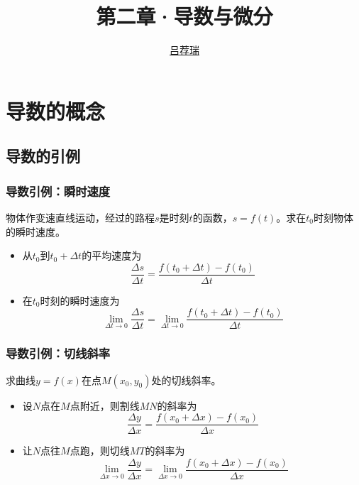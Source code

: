 \documentclass[14pt,notheorems,leqno,xcolor={rgb}]{beamer} %
\begin{document}
\title{第二章·导数与微分}
\author{\href{https://lvjr.bitbucket.io}{吕荐瑞}}

\begin{frame}[plain]
\titlepage
\end{frame}

\section{导数的概念}

\subsection{导数的引例}

\begin{frame}
\frametitle{导数引例：瞬时速度}
\begin{example}
物体作变速直线运动，经过的路程$s$是时刻$t$的函数，$s=f(t)$。求在$t_0$时刻物体的瞬时速度。
\end{example}\pause
\begin{itemize}[<+->]
  \item 从$t_0$到$t_0+\Delta t$的平均速度为
  $$\dfrac{\Delta s}{\Delta t}=\dfrac{f(t_0+\Delta t)-f(t_0)}{\Delta t}$$
  \item 在$t_0$时刻的瞬时速度为
  $$\lim\limits_{\Delta t\to0}\dfrac{\Delta s}{\Delta t}=\lim\limits_{\Delta t\to0}\dfrac{f(t_0+\Delta t)-f(t_0)}{\Delta t}$$
\end{itemize}
\end{frame}

\begin{frame}
\frametitle{导数引例：切线斜率}
\begin{example}
求曲线$y=f(x)$在点$M(x_0,y_0)$处的切线斜率。
\end{example}\pause
\begin{itemize}[<+->]
  \item 设$N$点在$M$点附近，则割线$MN$的斜率为
  $$\dfrac{\Delta y}{\Delta x}=\dfrac{f(x_0+\Delta x)-f(x_0)}{\Delta x}$$
  \item 让$N$点往$M$点跑，则切线$MT$的斜率为
  $$\lim\limits_{\Delta x\to0}\dfrac{\Delta y}{\Delta x}=\lim\limits_{\Delta x\to0}\dfrac{f(x_0+\Delta x)-f(x_0)}{\Delta x}$$
\end{itemize}
\end{frame}

\end{document}
